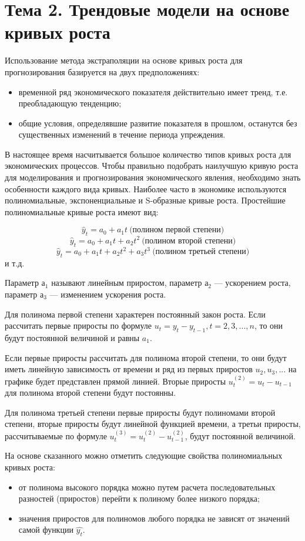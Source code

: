 \section{Тема 2. Трендовые модели на основе кривых роста}

Использование метода экстраполяции на основе кривых роста для прогнозирования базируется на двух предположениях:
\begin{itemize}
	\item временной ряд экономического показателя действительно имеет тренд, т.е. преобладающую тенденцию;
	\item общие условия, определявшие развитие показателя в прошлом, останутся без существенных изменений в течение периода упреждения.
\end{itemize}

В настоящее время насчитывается большое количество типов кривых роста для экономических процессов. Чтобы правильно подобрать наилучшую кривую роста для моделирования и прогнозирования экономического явления, необходимо знать особенности каждого вида кривых. Наиболее часто в экономике используются полиномиальные, экспоненциальные и S-образные кривые роста. Простейшие полиномиальные кривые роста имеют вид:

\[ \hat{y}_t = a_0 + a_1t \ \text{(полином первой степени)}\]
\[ \hat{y}_t = a_0 + a_1t +a_2t^2 \ \text{(полином второй степени)}\]
\[ \hat{y}_t = a_0 + a_1t +a_2t^2 + a_3t^3 \ \text{(полином третьей степени)}\]
и т.д.

Параметр $а_1$ называют линейным приростом, параметр $а_2$ --- ускорением роста, параметр $а_3$ --- изменением ускорения роста.

Для полинома первой степени характерен постоянный закон роста. Если рассчитать первые приросты по формуле $u_t = y_t - y_{t-1}, t = 2, 3, ..., n$, то они будут постоянной величиной и равны $a_1$.

Если первые приросты рассчитать для полинома второй степени, то они будут иметь линейную зависимость от времени и ряд из первых приростов $u_2, u_3, ...$ на графике будет представлен прямой линией. Вторые приросты $u_t^{(2)} = u_t - u_{t-1}$ для полинома второй степени будут постоянны.

Для полинома третьей степени первые приросты будут полиномами второй степени, вторые приросты будут линейной функцией времени, а третьи приросты, рассчитываемые по формуле $u_t^{(3)} = u_t^{(2)} - u_{t-1}^{(2)}$, будут постоянной величиной.

На основе сказанного можно отметить следующие свойства полиномиальных кривых роста:
\begin{itemize}
	\item от полинома высокого порядка можно путем расчета последовательных разностей (приростов) перейти к полиному более низкого порядка;
	\item значения приростов для полиномов любого порядка не зависят от значений самой функции $\hat{y_t}$.
\end{itemize}

